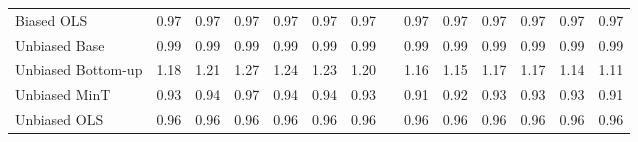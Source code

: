 \documentclass[12pt]{article}
\begin{document}
\begin{table}[htbp]
\begin{tabular}{lrrrrrrrrrrrrr}
    Biased OLS              & 0.97  & 0.97  & 0.97  & 0.97  & 0.97  & 0.97  &       & 0.97  & 0.97  & 0.97  & 0.97  & 0.97  & 0.97 \\
    Unbiased Base           & 0.99  & 0.99  & 0.99  & 0.99  & 0.99  & 0.99  &       & 0.99  & 0.99  & 0.99  & 0.99  & 0.99  & 0.99 \\
    Unbiased Bottom-up      & 1.18  & 1.21  & 1.27  & 1.24  & 1.23  & 1.20  &       & 1.16  & 1.15  & 1.17  & 1.17  & 1.14  & 1.11 \\
    Unbiased MinT           & 0.93  & 0.94  & 0.97  & 0.94  & 0.94  & 0.93  &       & 0.91  & 0.92  & 0.93  & 0.93  & 0.93  & 0.91 \\
    Unbiased OLS            & 0.96  & 0.96  & 0.96  & 0.96  & 0.96  & 0.96  &       & 0.96  & 0.96  & 0.96  & 0.96  & 0.96  & 0.96 \\\bottomrule
    \end{tabular}
  \label{tab:addlabel}%
\end{table}%
\end{document}
